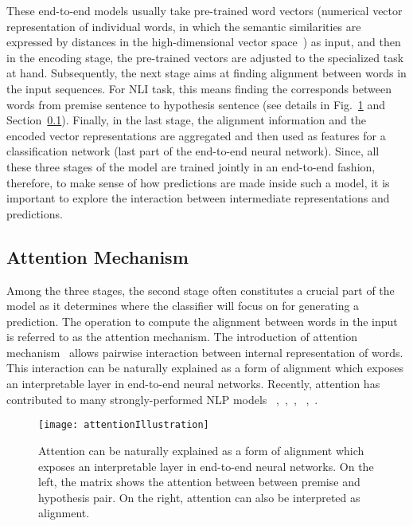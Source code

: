 These end-to-end models usually take pre-trained word vectors (numerical vector representation of individual words, in which the semantic similarities are expressed by distances in the high-dimensional vector space~\cite{MikolovSutskeverChen2013, PenningtonSocherManning2014}) as input, and then in the encoding stage, the pre-trained vectors are adjusted to the specialized task at hand. Subsequently, the next stage aims at finding alignment between words in the input sequences. For NLI task, this means finding the corresponds between words from premise sentence to hypothesis sentence (see details in Fig.~\ref{fig:attention} and Section~\ref{sec:attention}). Finally, in the last stage, the alignment information and the encoded vector representations are aggregated and then used as features for a classification network (last part of the end-to-end neural network).
%
Since, all these three stages of the model are trained jointly in an end-to-end fashion, therefore, to make sense of how predictions are made inside such a model, it is important to explore the interaction between intermediate representations and predictions.

\subsection{Attention Mechanism}
\label{sec:attention}
Among the three stages, the second stage often constitutes a crucial part of the model as it determines where the classifier will focus on for generating a prediction. The operation to compute the alignment between words in the input is referred to as the attention mechanism. 
The introduction of attention mechanism~\cite{bahdanau2014neural} allows
pairwise interaction between internal representation of words. 
This interaction can be naturally explained as a form of alignment which exposes an interpretable layer in end-to-end neural networks.
%
Recently, attention has contributed to many strongly-performed NLP models
~\cite{parikh2016emnlp},~\cite{rush2015neural},~\cite{yang2016hierarchical},
~\cite{seo2016bidirectional},~\cite{schwartz2017high}.


\begin{figure}[htbp]
\centering
\vspace{-2mm}
 \texttt{[image: attentionIllustration]}
 \caption{Attention can be naturally explained as a form of alignment which exposes an interpretable layer in end-to-end neural networks. On the left, the matrix shows the attention between between premise and hypothesis pair. On the right, attention can also be interpreted as alignment.}
\label{fig:attention}
\end{figure}

